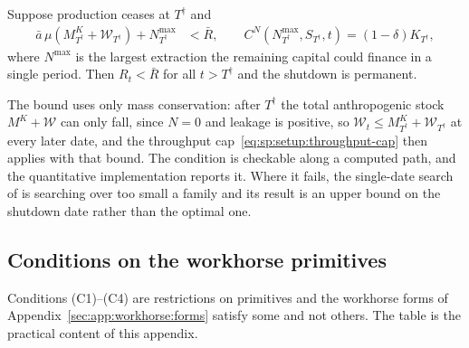 \begin{proposition}\label{prop:suff:absorbing}
Suppose production ceases at $T^{\dagger}$ and
\begin{align}
\bar a\,\mu\left(M^K_{T^{\dagger}}+\mathcal W_{T^{\dagger}}\right)+N^{\max}_{T^{\dagger}} &< \bar R,
\qquad
C^N\!\left(N^{\max}_{T^{\dagger}},S_{T^{\dagger}},t\right)=\left(1-\delta\right)K_{T^{\dagger}} ,
\label{eq:app:suff:absorbing}
\end{align}
where $N^{\max}$ is the largest extraction the remaining capital could finance in a single period. Then $R_t<\bar R$ for all $t>T^{\dagger}$ and the shutdown is permanent.
\end{proposition}

The bound uses only mass conservation: after $T^{\dagger}$ the total anthropogenic stock $M^K+\mathcal W$ can only fall, since $N=0$ and leakage is positive, so $\mathcal W_t\le M^K_{T^{\dagger}}+\mathcal W_{T^{\dagger}}$ at every later date, and the throughput cap~\eqref{eq:sp:setup:throughput-cap} then applies with that bound. The condition is checkable along a computed path, and the quantitative implementation reports it. Where it fails, the single-date search of  is searching over too small a family and its result is an upper bound on the shutdown date rather than the optimal one.

\subsection{Conditions on the workhorse primitives}\label{sec:app:suff:workhorse}

Conditions (C1)--(C4) are restrictions on primitives and the workhorse forms of Appendix~\ref{sec:app:workhorse:forms} satisfy some and not others. The table is the practical content of this appendix.

